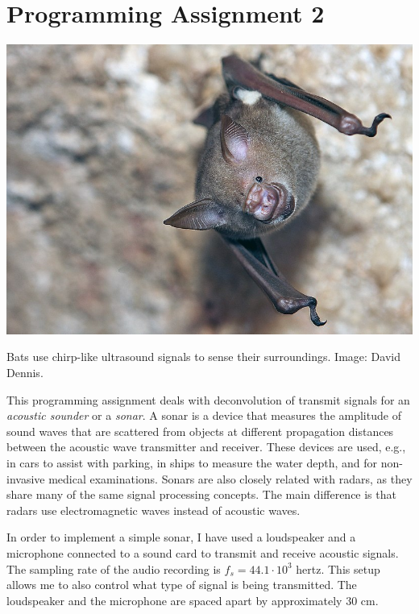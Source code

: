 \chapter{Programming Assignment 2}

\begin{marginfigure}[5cm]
  \begin{center}
    \includegraphics[width=\textwidth]{Assignments/figures/bat.jpg}
  \end{center}
  \caption{Bats use chirp-like ultrasound signals to sense their surroundings. Image: David Dennis.}
  \label{fig:bat_image}
\end{marginfigure}

This programming assignment deals with deconvolution of transmit
signals for an \emph{acoustic sounder} or a \emph{sonar}. A sonar is
a device that measures the amplitude of sound waves that are scattered
from objects at different propagation distances between the acoustic
wave transmitter and receiver. These devices are used, e.g., in cars to
assist with parking, in ships to measure the water depth, and for
non-invasive medical examinations. Sonars are also closely related
with radars, as they share many of the same signal processing
concepts. The main difference is that radars use electromagnetic waves
instead of acoustic waves.

In order to implement a simple sonar, I have used a loudspeaker and a
microphone connected to a sound card to transmit and receive acoustic
signals. The sampling rate of the audio recording is $f_s=44.1\cdot
10^3$ hertz. This setup allows me to also control what type of
signal is being transmitted. The loudspeaker and the microphone are
spaced apart by approximately 30 cm.
 
